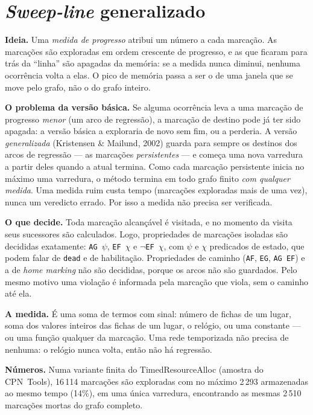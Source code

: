 \documentclass[11pt,a4paper]{report}
\newcommand{\cpntools}{CPN~Tools}
\newcommand{\code}[1]{\texttt{\small #1}}
\theoremstyle{definition}
\begin{document}
\section{\emph{Sweep-line} generalizado}

\textbf{Ideia.} Uma \emph{medida de progresso} atribui um número a cada
marcação. As marcações são exploradas em ordem crescente de progresso, e as que
ficaram para trás da ``linha'' são apagadas da memória: se a medida nunca
diminui, nenhuma ocorrência volta a elas. O pico de memória passa a ser o de
uma janela que se move pelo grafo, não o do grafo inteiro.

\textbf{O problema da versão básica.} Se alguma ocorrência leva a uma marcação
de progresso \emph{menor} (um arco de regressão), a marcação de destino pode já
ter sido apagada: a versão básica a exploraria de novo sem fim, ou a perderia.
A versão \emph{generalizada} (Kristensen \& Mailund, 2002) guarda para sempre
os destinos dos arcos de regressão --- as marcações \emph{persistentes} --- e
começa uma nova varredura a partir deles quando a atual termina. Como cada
marcação persistente inicia no máximo uma varredura, o método termina em todo
grafo finito \emph{com qualquer medida}. Uma medida ruim custa tempo
(marcações exploradas mais de uma vez), nunca um veredicto errado. Por isso a
medida não precisa ser verificada.

\textbf{O que decide.} Toda marcação alcançável é visitada, e no momento da
visita seus sucessores são calculados. Logo, propriedades de marcações
isoladas são decididas exatamente: \code{AG}~$\psi$, \code{EF}~$\chi$ e
$\neg$\code{EF}~$\chi$, com $\psi$ e $\chi$ predicados de estado, que podem
falar de \code{dead} e de habilitação. Propriedades de caminho (\code{AF},
\code{EG}, \code{AG EF}) e a de \emph{home marking} não são decididas, porque
os arcos não são guardados. Pelo mesmo motivo uma violação é informada pela
marcação que viola, sem o caminho até ela.

\textbf{A medida.} É uma soma de termos com sinal: número de fichas de um
lugar, soma dos valores inteiros das fichas de um lugar, o relógio, ou uma
constante --- ou uma função qualquer da marcação. Uma rede temporizada não
precisa de nenhuma: o relógio nunca volta, então não há regressão.

\textbf{Números.} Numa variante finita do TimedResourceAlloc (amostra do
\cpntools{}), 16\,114 marcações são exploradas com no máximo 2\,293
armazenadas ao mesmo tempo (14\%), em uma única varredura, encontrando as
mesmas 2\,510 marcações mortas do grafo completo.
\end{document}
